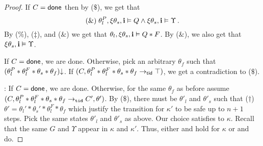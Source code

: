 \begin{proof}
If $C = {\sf done}$ then by ($\$$), 
we get that 
$$
(\&) \;\theta^P_l,\xi\theta_s,{\bf i} \vDash Q \land \xi\theta_s,{\bf i} \vDash \Upsilon \,.
$$
By ($\%$), ($\ddag$),  and
($\&$) %
we get that $\theta_l,\xi\theta_s,{\bf i} \vDash Q*F$.
By ($\&$), we also get that $\xi\theta_s, {\bf i} \vDash \Upsilon$.

If $C={\sf done}$, we are done.
Otherwise, 
pick an arbitrary $\theta_f$ such that %
$(\theta^P_l * \theta^F_l*\theta_s*\theta_f)\mathpunct{\downarrow}$.
If $(C,\theta^P_l * \theta^F_l*\theta_s*\theta_f \rightarrow_{{\sf tid}} \top)$,   we get a contradiction to ($\$$).

: 
If $C={\sf done}$, we are done.
Otherwise, 
for the same $\theta_f$ as before
assume $(C, \theta^P_l * \theta^F_l*\theta_s*\theta_f \rightarrow_{\texttt{tid}} C',\theta')$. 
By ($\$$), 
there must be  $\theta'_l$  and $\theta'_s$ such that 
($\dag$) $\theta' = \theta_l' * \theta_s' * \theta^F_l * \theta_f$ 
which justify the transition for $\kappa'$ to be safe up to $n+1$ steps.
Pick the same   states $\theta'_l$  and $\theta'_s$  as above.
Our choice satisfies  to $\kappa$.
Recall that  
the same $G$ and $\Upsilon$ appear in $\kappa$  and $\kappa'$.
Thus, either  and  
hold for $\kappa$ 
or  and  do.


\end{proof}
